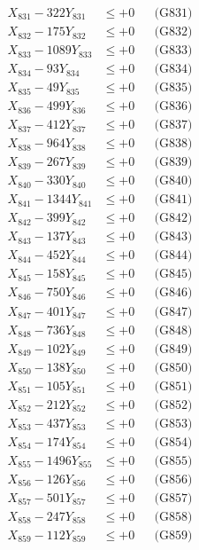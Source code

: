 \documentclass[a4paper,10pt]{article}
\begin{document}
{\begin{align}
\allowbreak
X_{831} - 322Y_{831} &\leq +0 && \text{(G831)} \\
X_{832} - 175Y_{832} &\leq +0 && \text{(G832)} \\
X_{833} - 1089Y_{833} &\leq +0 && \text{(G833)} \\
X_{834} - 93Y_{834} &\leq +0 && \text{(G834)} \\
X_{835} - 49Y_{835} &\leq +0 && \text{(G835)} \\
X_{836} - 499Y_{836} &\leq +0 && \text{(G836)} \\
X_{837} - 412Y_{837} &\leq +0 && \text{(G837)} \\
X_{838} - 964Y_{838} &\leq +0 && \text{(G838)} \\
X_{839} - 267Y_{839} &\leq +0 && \text{(G839)} \\
X_{840} - 330Y_{840} &\leq +0 && \text{(G840)} \\
\allowbreak
X_{841} - 1344Y_{841} &\leq +0 && \text{(G841)} \\
X_{842} - 399Y_{842} &\leq +0 && \text{(G842)} \\
X_{843} - 137Y_{843} &\leq +0 && \text{(G843)} \\
X_{844} - 452Y_{844} &\leq +0 && \text{(G844)} \\
X_{845} - 158Y_{845} &\leq +0 && \text{(G845)} \\
X_{846} - 750Y_{846} &\leq +0 && \text{(G846)} \\
X_{847} - 401Y_{847} &\leq +0 && \text{(G847)} \\
X_{848} - 736Y_{848} &\leq +0 && \text{(G848)} \\
X_{849} - 102Y_{849} &\leq +0 && \text{(G849)} \\
X_{850} - 138Y_{850} &\leq +0 && \text{(G850)} \\
\allowbreak
X_{851} - 105Y_{851} &\leq +0 && \text{(G851)} \\
X_{852} - 212Y_{852} &\leq +0 && \text{(G852)} \\
X_{853} - 437Y_{853} &\leq +0 && \text{(G853)} \\
X_{854} - 174Y_{854} &\leq +0 && \text{(G854)} \\
X_{855} - 1496Y_{855} &\leq +0 && \text{(G855)} \\
X_{856} - 126Y_{856} &\leq +0 && \text{(G856)} \\
X_{857} - 501Y_{857} &\leq +0 && \text{(G857)} \\
X_{858} - 247Y_{858} &\leq +0 && \text{(G858)} \\
X_{859} - 112Y_{859} &\leq +0 && \text{(G859)} \\

\end{align}}
\end{document}
